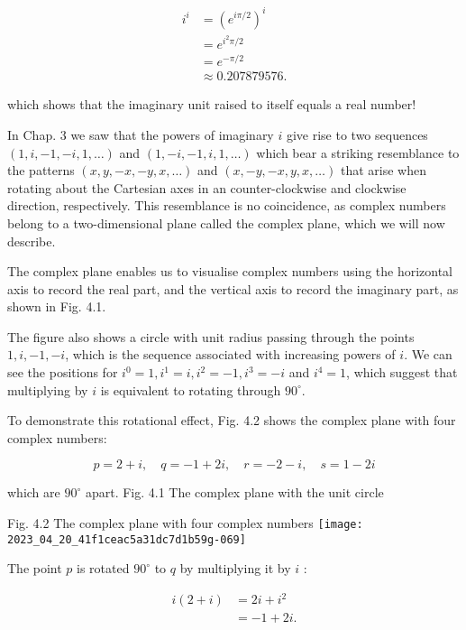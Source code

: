 $$
    \begin{aligned}
        i^{i} & =\left(e^{i \pi / 2}\right)^{i} \\
              & =e^{i^{2} \pi / 2}              \\
              & =e^{-\pi / 2}                   \\
              & \approx 0.207879576 .
    \end{aligned}
$$

which shows that the imaginary unit raised to itself equals a real number!

In Chap. 3 we saw that the powers of imaginary $i$ give rise to two sequences $(1, i,-1,-i, 1, \ldots)$ and $(1,-i,-1, i, 1, \ldots)$ which bear a striking resemblance to the patterns $(x, y,-x,-y, x, \ldots)$ and $(x,-y,-x, y, x, \ldots)$ that arise when rotating about the Cartesian axes in an counter-clockwise and clockwise direction, respectively. This resemblance is no coincidence, as complex numbers belong to a two-dimensional plane called the complex plane, which we will now describe.

The complex plane enables us to visualise complex numbers using the horizontal axis to record the real part, and the vertical axis to record the imaginary part, as shown in Fig. 4.1.

The figure also shows a circle with unit radius passing through the points $1, i,-1,-i$, which is the sequence associated with increasing powers of $i$. We can see the positions for $i^{0}=1, i^{1}=i, i^{2}=-1, i^{3}=-i$ and $i^{4}=1$, which suggest that multiplying by $i$ is equivalent to rotating through $90^{\circ}$.

To demonstrate this rotational effect, Fig. 4.2 shows the complex plane with four complex numbers:

$$
    p=2+i, \quad q=-1+2 i, \quad r=-2-i, \quad s=1-2 i
$$

which are $90^{\circ}$ apart. Fig. 4.1 The complex plane with the unit circle

Fig. 4.2 The complex plane with four complex numbers
\texttt{[image: 2023\_04\_20\_41f1ceac5a31dc7d1b59g-069]}

The point $p$ is rotated $90^{\circ}$ to $q$ by multiplying it by $i$ :

$$
    \begin{aligned}
        i(2+i) & =2 i+i^{2} \\
               & =-1+2 i .
    \end{aligned}
$$

